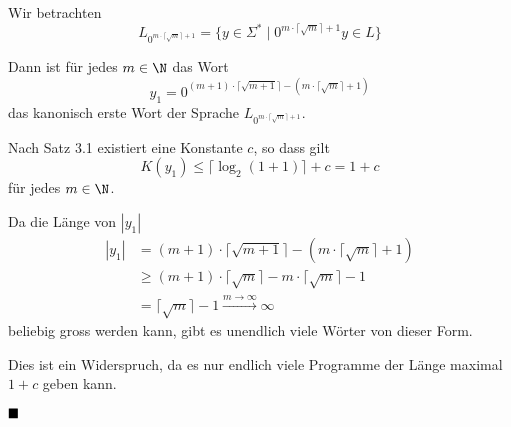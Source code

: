    Wir betrachten $$L_{0^{m\cdot \lceil \sqrt{m}\rceil + 1}} = \{y \in \Sigma^* \mid 0^{m\cdot \lceil \sqrt{m}\rceil + 1}y \in L\}$$

   Dann ist für jedes $m \in \N$ das Wort $$y_1 = 0^{(m+1)\cdot \lceil \sqrt{m+1}\rceil - (m\cdot \lceil \sqrt{m}\rceil + 1)}$$
   das kanonisch erste Wort der Sprache $L_{0^{m\cdot \lceil \sqrt{m}\rceil + 1}}$.

    Nach Satz 3.1 existiert eine Konstante $c$, so dass gilt
    $$K(y_1) \leq \lceil\log_2(1+1)\rceil + c = 1 + c$$
    für jedes $m \in \N$.

    Da die Länge von $|y_1|$
    \begin{align*}
        |y_1| &= (m+1)\cdot \lceil \sqrt{m+1}\rceil - (m\cdot \lceil \sqrt{m}\rceil + 1)\\
             &\geq (m+1) \cdot  \lceil \sqrt{m}\rceil -m\cdot \lceil \sqrt{m}\rceil -1\\
             &= \lceil \sqrt{m}\rceil -1 \overset{m \to \infty}{\longrightarrow} \infty
    \end{align*}
    beliebig gross werden kann, gibt es unendlich viele Wörter von dieser Form.

    Dies ist ein Widerspruch, da es nur endlich viele Programme der Länge maximal $1+c$ geben kann.

    $\hfill\blacksquare$
